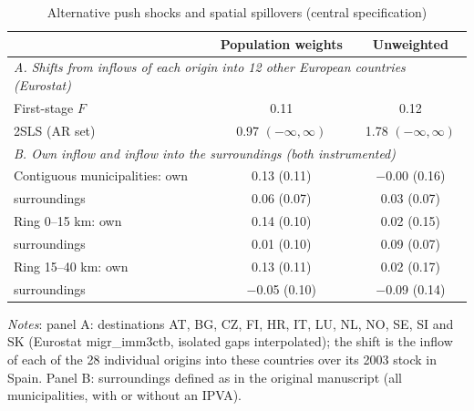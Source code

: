 \begin{table}[!htbp]\centering\small
\caption{Alternative push shocks and spatial spillovers (central specification)}\label{tab:altspatial}
\begin{tabular}{lcc}\toprule
 & Population weights & Unweighted\\\midrule
\multicolumn{3}{l}{\textit{A. Shifts from inflows of each origin into 12 other European countries (Eurostat)}}\\
First-stage $F$ & 0.11 & 0.12\\
2SLS (AR set) & 0.97 $(-\infty,\infty)$ & 1.78 $(-\infty,\infty)$\\
\midrule\multicolumn{3}{l}{\textit{B. Own inflow and inflow into the surroundings (both instrumented)}}\\
Contiguous municipalities: own & 0.13 (0.11) & $-$0.00 (0.16)\\
\quad surroundings & 0.06 (0.07) & 0.03 (0.07)\\
Ring 0--15 km: own & 0.14 (0.10) & 0.02 (0.15)\\
\quad surroundings & 0.01 (0.10) & 0.09 (0.07)\\
Ring 15--40 km: own & 0.13 (0.11) & 0.02 (0.17)\\
\quad surroundings & $-$0.05 (0.10) & $-$0.09 (0.14)\\
\bottomrule\end{tabular}
\begin{minipage}{0.95\linewidth}\footnotesize\vspace{4pt}\textit{Notes}: panel A: destinations AT, BG, CZ, FI, HR, IT, LU, NL, NO, SE, SI and SK (Eurostat migr\_imm3ctb, isolated gaps interpolated); the shift is the inflow of each of the 28 individual origins into these countries over its 2003 stock in Spain. Panel B: surroundings defined as in the original manuscript (all municipalities, with or without an IPVA).\end{minipage}\end{table}
